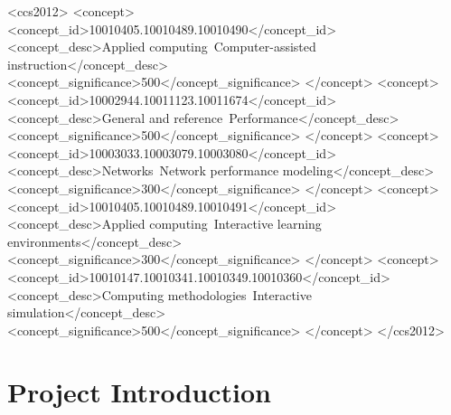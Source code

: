 \documentclass[acmlarge]{acmart}
\begin{document}
\begin{CCSXML}
<ccs2012>
   <concept>
       <concept_id>10010405.10010489.10010490</concept_id>
       <concept_desc>Applied computing~Computer-assisted instruction</concept_desc>
       <concept_significance>500</concept_significance>
       </concept>
   <concept>
       <concept_id>10002944.10011123.10011674</concept_id>
       <concept_desc>General and reference~Performance</concept_desc>
       <concept_significance>500</concept_significance>
       </concept>
   <concept>
       <concept_id>10003033.10003079.10003080</concept_id>
       <concept_desc>Networks~Network performance modeling</concept_desc>
       <concept_significance>300</concept_significance>
       </concept>
   <concept>
       <concept_id>10010405.10010489.10010491</concept_id>
       <concept_desc>Applied computing~Interactive learning environments</concept_desc>
       <concept_significance>300</concept_significance>
       </concept>
   <concept>
       <concept_id>10010147.10010341.10010349.10010360</concept_id>
       <concept_desc>Computing methodologies~Interactive simulation</concept_desc>
       <concept_significance>500</concept_significance>
       </concept>
 </ccs2012>
\end{CCSXML}




\maketitle


\section{Project Introduction}

%            
\end{document}
